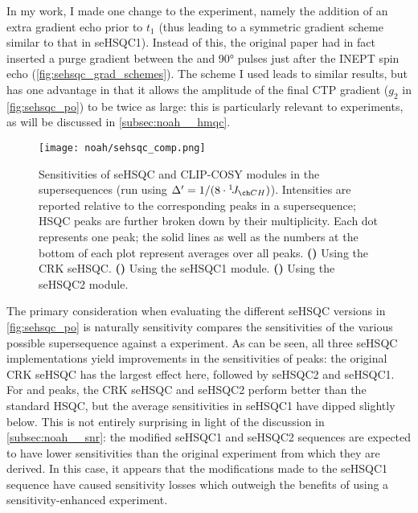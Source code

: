 In my work, I made one change to the experiment, namely the addition of an extra gradient echo prior to $t_1$ (thus leading to a symmetric gradient scheme similar to that in seHSQC1).
Instead of this, the original paper had in fact inserted a purge gradient between the \proton{} and \carbon{} \ang{90} pulses just after the INEPT spin echo (\cref{fig:sehsqc_grad_schemes}).
The scheme I used leads to similar results, but has one advantage in that it allows the amplitude of the final CTP gradient ($g_2$ in \cref{fig:sehsqc_po}) to be twice as large: this is particularly relevant to \nitrogen{} experiments, as will be discussed in \cref{subsec:noah__hmqc}.

\begin{figure}[!ht]
    \centering
    \texttt{[image: noah/sehsqc\_comp.png]}%
    {\label{fig:noah_sehsqc_comp_crk}}%
    {\label{fig:noah_sehsqc_comp_v1}}%
    {\label{fig:noah_sehsqc_comp_v2}}%
    \caption[Comparison of  sensitivities]{
        Sensitivities of seHSQC and CLIP-COSY modules in the  supersequences (run using $\Delta' = 1 / (8 \cdot \oneJ{CH})$).
        Intensities are reported relative to the corresponding peaks in a  supersequence; HSQC peaks are further broken down by their multiplicity.
        Each dot represents one peak; the solid lines as well as the numbers at the bottom of each plot represent averages over all peaks.
        \textbf{()} Using the CRK seHSQC.
        \textbf{()} Using the seHSQC1 module.
        \textbf{()} Using the seHSQC2 module.
    }
    \label{fig:noah_sehsqc_comp}
\end{figure}

The primary consideration when evaluating the different seHSQC versions in \cref{fig:sehsqc_po} is naturally sensitivity
 compares the sensitivities of the various possible  supersequence against a  experiment.
As can be seen, all three seHSQC implementations yield improvements in the sensitivities of  peaks: the original CRK seHSQC has the largest effect here, followed by seHSQC2 and seHSQC1.
For  and  peaks, the CRK seHSQC and seHSQC2 perform better than the standard HSQC, but the average sensitivities in seHSQC1 have dipped slightly below.
This is not entirely surprising in light of the discussion in \cref{subsec:noah__snr}: the modified seHSQC1 and seHSQC2 sequences are expected to have lower sensitivities than the original experiment from which they are derived.
In this case, it appears that the modifications made to the seHSQC1 sequence have caused sensitivity losses which outweigh the benefits of using a sensitivity-enhanced experiment.


